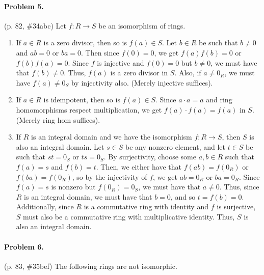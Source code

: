 \documentclass[12pt]{article}
\begin{document}
\paragraph{Problem 5.} (p. 82, \#34abc)
Let $f : R \to S$ be an isomorphism of rings.
\begin{enumerate}
\item[a.] {
    If $a \in R$ is a zero divisor, then so is $f(a) \in S$. Let $b \in R$ be such that $b \neq 0$ and $ab = 0$ or $ba = 0$. Then since $f(0) = 0$, we get $f(a)f(b) = 0$ or $f(b)f(a) = 0$. Since $f$ is injective and $f(0) = 0$ but $b \neq 0$, we must have that $f(b) \neq 0$. Thus, $f(a)$ is a zero divisor in $S$. Also, if $a \neq 0_R$, we must have $f(a) \neq 0_S$ by injectivity also. (Merely injective suffices).
}
\item[b.] {
    If $a \in R$ is idempotent, then so is $f(a) \in S$. Since $a\cdot a = a$ and ring homomorphisms respect multiplication, we get $f(a) \cdot f(a) = f(a)$ in $S$. (Merely ring hom suffices).
}
\item[c.] {
    If $R$ is an integral domain and we have the isomorphism $f : R \to S$, then $S$ is also an integral domain.
    Let $s \in S$ be any nonzero element, and let $t \in S$ be such that $s t = 0_S$ or $ts = 0_S$. By surjectivity, choose some $a,b \in R$ such that $f(a) = s$ and $f(b) = t$. Then, we either have that $f(ab) = f(0_R)$ or $f(ba) = f(0_R)$, so by the injectivity of $f$, we get $ab = 0_R$ or $ba = 0_R$. Since $f(a)=s$ is nonzero but $f(0_R) = 0_S$, we must have that $a \neq 0$. Thus, since $R$ is an integral domain, we must have that $b = 0$, and so $t = f(b) = 0$. Additionally, since $R$ is a commutative ring with identity and $f$ is surjective, $S$ must also be a commutative ring with multiplicative identity. Thus, $S$ is also an integral domain.
}
\end{enumerate}

\paragraph{Problem 6.} (p. 83, \#35bef) The following rings are not isomorphic.
\end{document}
